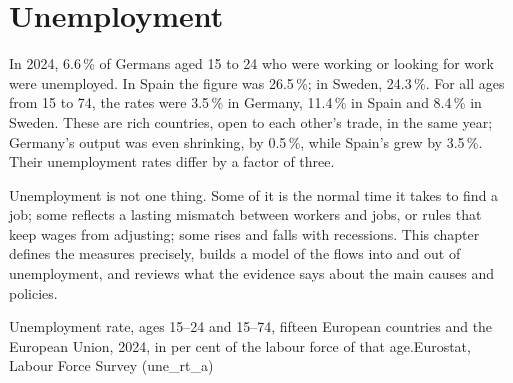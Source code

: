 \chapter{Unemployment}\label{ch:g11:unemployment}

In 2024, 6.6\,\% of Germans aged 15 to 24 who were working or looking for work were unemployed. In Spain the figure was 26.5\,\%; in Sweden, 24.3\,\%. For all ages from
15 to 74, the rates were 3.5\,\% in Germany, 11.4\,\% in Spain and 8.4\,\% in Sweden. These are rich countries, open to each other's trade, in the same year; Germany's output was even
shrinking, by 0.5\,\%, while Spain's grew by 3.5\,\%. Their unemployment rates differ by a factor of three.

Unemployment is not one thing. Some of it is the normal time it takes to find a job; some reflects a lasting mismatch between workers and jobs, or rules that keep
wages from adjusting; some rises and falls with recessions. This chapter defines the measures precisely, builds a model of the flows into and out of unemployment, and
reviews what the evidence says about the main causes and policies.

\begin{openingchart}{Unemployment rate, ages 15--24 and 15--74, fifteen European countries and the European Union, 2024, in per cent of the labour force of that
age.}{Eurostat, Labour Force Survey (une\_rt\_a)}
\end{openingchart}

